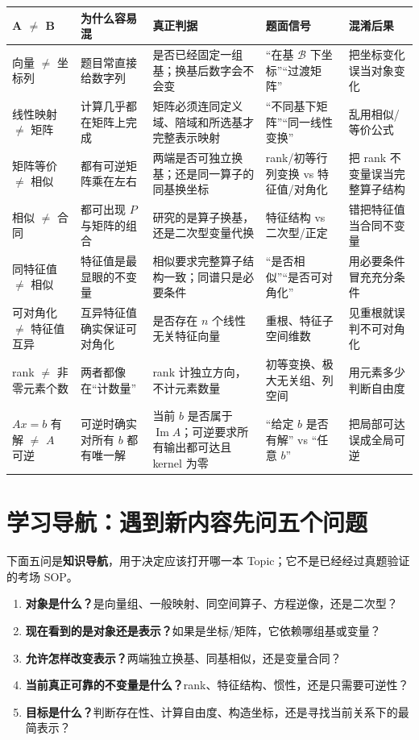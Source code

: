 \documentclass[11pt,a4paper]{ctexart}
\newcommand{\kw}[1]{\textbf{\color{deep}#1}}
\begin{document}
\small
\begin{longtable}{L{3.15cm}L{3.15cm}L{3.65cm}L{3.15cm}L{2.7cm}}
\toprule
\textbf{A $\neq$ B} & \textbf{为什么容易混} & \textbf{真正判据} & \textbf{题面信号} & \textbf{混淆后果}\\
\midrule
向量 $\neq$ 坐标列 & 题目常直接给数字列 & 是否已经固定一组基；换基后数字会不会变 & “在基 $\mathcal B$ 下坐标”“过渡矩阵” & 把坐标变化误当对象变化\\
线性映射 $\neq$ 矩阵 & 计算几乎都在矩阵上完成 & 矩阵必须连同定义域、陪域和所选基才完整表示映射 & “不同基下矩阵”“同一线性变换” & 乱用相似/等价公式\\
矩阵等价 $\neq$ 相似 & 都有可逆矩阵乘在左右 & 两端是否可独立换基；还是同一算子的同基换坐标 & rank/初等行列变换 vs 特征值/对角化 & 把 rank 不变量误当完整算子结构\\
相似 $\neq$ 合同 & 都可出现 $P$ 与矩阵的组合 & 研究的是算子换基，还是二次型变量代换 & 特征结构 vs 二次型/正定 & 错把特征值当合同不变量\\
同特征值 $\neq$ 相似 & 特征值是最显眼的不变量 & 相似要求完整算子结构一致；同谱只是必要条件 & “是否相似”“是否可对角化” & 用必要条件冒充充分条件\\
可对角化 $\neq$ 特征值互异 & 互异特征值确实保证可对角化 & 是否存在 $n$ 个线性无关特征向量 & 重根、特征子空间维数 & 见重根就误判不可对角化\\
rank $\neq$ 非零元素个数 & 两者都像在“计数量” & rank 计独立方向，不计元素数量 & 初等变换、极大无关组、列空间 & 用元素多少判断自由度\\
$Ax=b$ 有解 $\neq$ $A$ 可逆 & 可逆时确实对所有 $b$ 都有唯一解 & 当前 $b$ 是否属于 $\operatorname{Im}A$；可逆要求所有输出都可达且 kernel 为零 & “给定 $b$ 是否有解” vs “任意 $b$” & 把局部可达误成全局可逆\\
\bottomrule
\end{longtable}
\normalsize

\section{学习导航：遇到新内容先问五个问题}

下面五问是\kw{知识导航}，用于决定应该打开哪一本 Topic；它不是已经经过真题验证的考场 SOP。

\begin{enumerate}
  \item \kw{对象是什么？}是向量组、一般映射、同空间算子、方程逆像，还是二次型？
  \item \kw{现在看到的是对象还是表示？}如果是坐标/矩阵，它依赖哪组基或变量？
  \item \kw{允许怎样改变表示？}两端独立换基、同基相似，还是变量合同？
  \item \kw{当前真正可靠的不变量是什么？}rank、特征结构、惯性，还是只需要可逆性？
  \item \kw{目标是什么？}判断存在性、计算自由度、构造坐标，还是寻找当前关系下的最简表示？
\end{enumerate}
\end{document}
